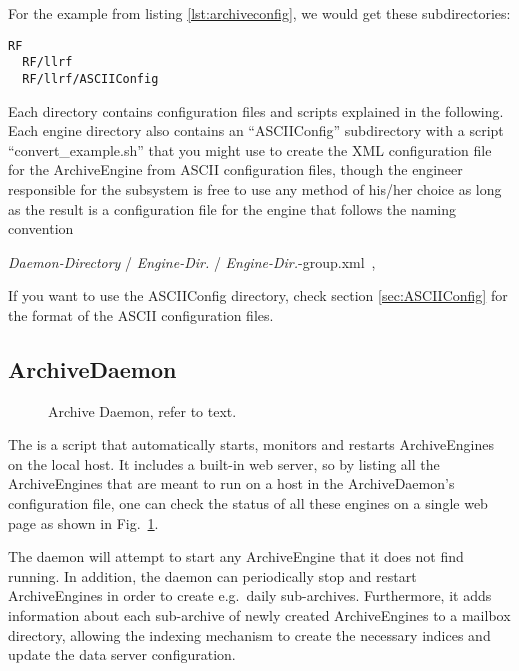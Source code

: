 For the example from listing \ref{lst:archiveconfig}, we would get
these subdirectories:
	\begin{lstlisting}[frame=none,keywordstyle=\sffamily]
  RF
  RF/llrf
  RF/llrf/ASCIIConfig
\end{lstlisting}
\noindent Each directory contains configuration files and scripts
explained in the following. Each engine directory also contains an
``ASCIIConfig'' subdirectory with a script ``convert\_example.sh''
that you might use to create the XML configuration file for the
ArchiveEngine from ASCII configuration files, though the engineer
responsible for the subsystem is free to use any method of his/her
choice as long as the result is a configuration file for the engine
that follows the naming convention
\begin{center}
{\it Daemon-Directory} / {\it Engine-Dir.} / {\it Engine-Dir.}-group.xml~,\\
\end{center}
If you want to use the ASCIIConfig directory, check section
\ref{sec:ASCIIConfig} for the format of the ASCII configuration files.

\subsection{ArchiveDaemon} \label{sec:daemon}
\begin{figure}[htb]
\begin{center}
\end{center}
\caption{\label{fig:daemon}Archive Daemon, refer to text.}
\end{figure}

\noindent The  is a script that automatically starts,
monitors and restarts ArchiveEngines on the local host. It includes a
built-in web server, so by listing all the ArchiveEngines that are
meant to run on a host in the ArchiveDaemon's configuration file, one
can check the status of all these engines on a single web page as
shown in Fig.~\ref{fig:daemon}.

The daemon will attempt to start any ArchiveEngine
that it does not find running. In addition, the daemon can
periodically stop and restart ArchiveEngines in order to create
e.g.\ daily sub-archives.  Furthermore, it adds information about
each sub-archive of newly created ArchiveEngines to a mailbox directory,
allowing the indexing mechanism to create the necessary indices
and update the data server configuration.

